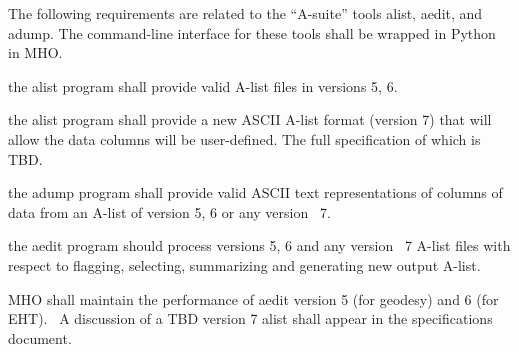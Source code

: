 The following requirements are related to the ``A-suite'' tools alist, aedit,
and adump.  The command-line interface for these tools shall be wrapped
in Python in \acs{MHO}.

\begin{description}

 the \acs{alist} program shall provide valid \acs{A-list}
    files in versions 5, 6. 

 the \acs{alist} program shall provide a new ASCII
 A-list format (version 7) that will allow the data columns will be user-defined.
 The full specification of which is TBD.

 the \acs{adump} program shall provide valid ASCII text
    representations of columns of data from an \acs{A-list} of version
    5, 6 or any version \TBD~7.

 the \acs{aedit} program should process versions 5, 6 and
    any version \TBD~7 \acs{A-list} files with respect to flagging,
    selecting, summarizing and generating new output \acs{A-list}.


 \ac{MHO} shall maintain the performance of \acs{aedit} version
5 (for geodesy) and 6 (for EHT). \TBD~A discussion of a TBD
version 7 alist shall appear in the specifications document.

%
%
%
%


\end{description}
